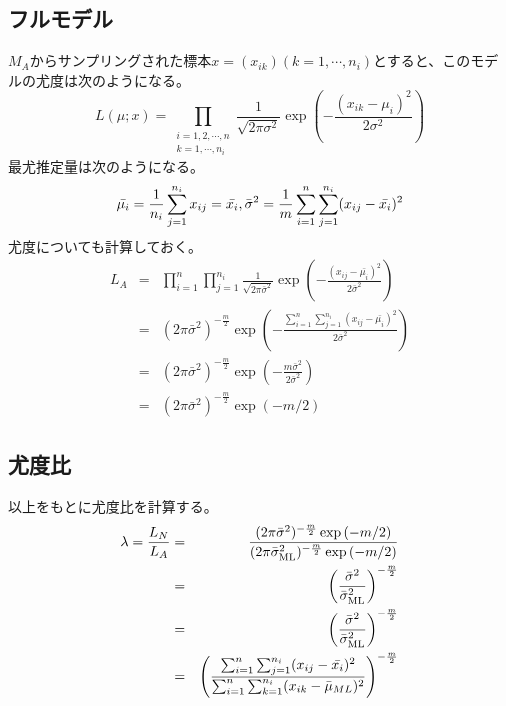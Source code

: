 \subsection{フルモデル}
$M_A$からサンプリングされた標本$x = (x_{ik}) (k=1,\cdots,n_i)$とすると、このモデルの尤度は次のようになる。
\begin{equation*}
    L(\mu;x) = \prod_{\substack{i=1,2,\cdots,n \\ k=1,\cdots,n_i}}\frac{1}{\sqrt{2\pi\sigma^2}}\exp(-\frac{(x_{ik}-\mu_i)^2}{2\sigma^2})
\end{equation*}
最尤推定量は次のようになる。
\begin{equation*}
 \bar{\mu_i} = \frac{1}{n_i}\sum_{j=1}^{n_i} x_{ij} = \bar{x_i},\\
 \bar{\sigma}^2 = \frac{1}{m} \sum_{i=1}^n \sum_{j=1}^{n_i} (x_{ij}-\bar{x_i})^2
\end{equation*}
尤度についても計算しておく。
\begin{eqnarray*}\label{anova_model_likelihood}
 L_A &=& \prod_{i=1}^n \prod_{j=1}^{n_i}\frac{1}{\sqrt{2\pi \bar{\sigma}^2}}\exp\left(  -\frac{(x_{ij}-\bar{\mu_i})^2}{2 \bar{\sigma}^2}\right) \\
 &=&  (2\pi \bar{\sigma}^2)^{-\frac{m}{2}}\exp\left(  -\frac{\sum_{i=1}^n \sum_{j=1}^{n_i} (x_{ij}-\bar{\mu_i})^2}{2 \bar{\sigma}^2}\right) \\
 &=&  (2\pi \bar{\sigma}^2)^{-\frac{m}{2}}\exp\left(  -\frac{ m \bar{\sigma}^2}{ 2\bar{\sigma}^2}\right) \\
 &=&  (2\pi \bar{\sigma}^2)^{-\frac{m}{2} }\exp\left(  -m/2\right) 
\end{eqnarray*}

\subsection{尤度比}
以上をもとに尤度比を計算する。
\begin{eqnarray*}
 \lambda =\frac{L_N}{L_A} &=& \frac{(2\pi \bar{\sigma}^2)^{-\frac{m}{2} }\exp\left(  -m/2\right) }{  (2\pi \bar{\sigma}^2_{\rm{ML}})^{-\frac{m}{2} }\exp\left(  -m/2\right)  }\\
 &=& \left( \frac{ \bar{\sigma}^2}{ \bar{\sigma}^2_{\rm{ML}} }\right)^{-\frac{m}{2}}\\
 &=& \left( \frac{ \bar{\sigma}^2}{ \bar{\sigma}^2_{\rm{ML}} }\right)^{-\frac{m}{2}} \\
&=& \left( \frac{ \sum_{i=1}^n \sum_{j=1}^{n_i} (x_{ij}-\bar{x_i})^2 }{ \sum_{i=1}^n \sum_{k=1}^{n_i}(x_{ik} -\bar{\mu}_{ML})^2 } \right)^{-\frac{m}{2}}
\end{eqnarray*}


